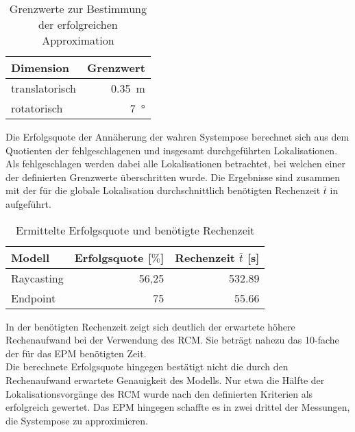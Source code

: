 \begin{table}[ht]
	\centering
	\caption{Grenzwerte zur Bestimmung der erfolgreichen Approximation}
	\label{tab.thresh_glob}
	\vspace*{-3mm}
	\begin{tabular}[ht]{|l|r|}\hline
		\rowcolor{Snow2}
		Dimension		& Grenzwert 					\\ \hline
		translatorisch  	& \SI{0,35}{\meter}			\\ \hline
		rotatorisch		& \SI{7}{°}					\\ \hline
	\end{tabular} 
\end{table}

Die Erfolgsquote der Annäherung der wahren Systempose berechnet sich aus dem Quotienten der fehlgeschlagenen und insgesamt durchgeführten Lokalisationen. Als fehlgeschlagen werden dabei alle Lokalisationen betrachtet, bei welchen einer der definierten Grenzwerte überschritten wurde. Die Ergebnisse sind zusammen mit der für die globale Lokalisation durchschnittlich benötigten Rechenzeit $\bar{t}$ in  aufgeführt.

\begin{table}[ht]
	\centering
	\caption{Ermittelte Erfolgsquote und benötigte Rechenzeit}
	\label{tab.approx_time}
	\vspace*{-3mm}
	\begin{tabular}[ht]{|l|r|r|}\hline
		\rowcolor{Snow2}
		Modell			& Erfolgsquote [$\%$]	&	Rechenzeit $\bar{t}$	 [s]	\\ \hline
		Raycasting		& 56,25					&	\SI{532,89}{}			\\ \hline		
		Endpoint			& 75						&	\SI{55,66}{}			\\ \hline
	\end{tabular} 
\end{table}

In der benötigten Rechenzeit zeigt sich deutlich der erwartete höhere Rechenaufwand bei der Verwendung des RCM. Sie beträgt nahezu das \SI{10}{}-fache der für das EPM benötigten Zeit.\\
Die berechnete Erfolgsquote hingegen bestätigt nicht die durch den Rechenaufwand erwartete Genauigkeit des Modells. Nur etwa die Hälfte der Lokalisationsvorgänge des RCM wurde nach den definierten Kriterien als erfolgreich gewertet. Das EPM hingegen schaffte es in zwei drittel der Messungen, die Systempose zu approximieren.\\


